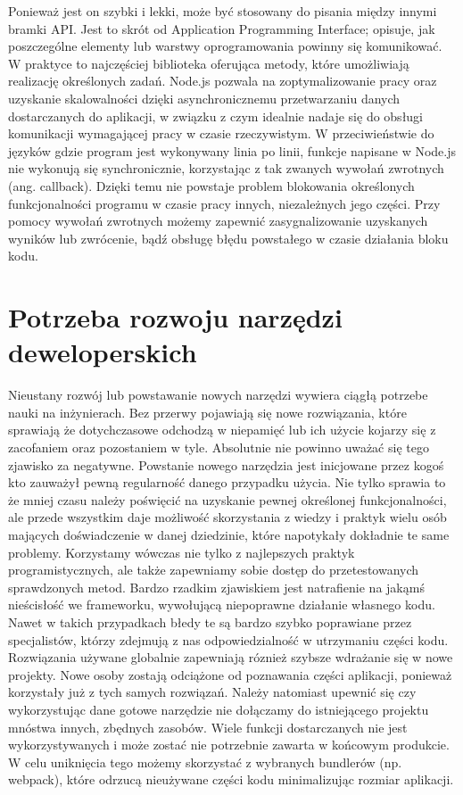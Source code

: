 \documentclass[12pt]{report}
\begin{document}
    Ponieważ jest on szybki i lekki, może być stosowany do pisania między innymi bramki API.
    Jest to skrót od Application Programming Interface; opisuje, jak poszczególne elementy lub warstwy oprogramowania powinny się komunikować.
    W praktyce to najczęściej biblioteka oferująca metody, które umożliwiają realizację określonych zadań.
    Node.js pozwala na zoptymalizowanie pracy oraz uzyskanie skalowalności dzięki asynchronicznemu przetwarzaniu danych dostarczanych do aplikacji, w związku z czym idealnie nadaje się do obsługi komunikacji wymagającej pracy w czasie rzeczywistym.
    W przeciwieństwie do języków gdzie program jest wykonywany linia po linii, funkcje napisane w Node.js nie wykonują się synchronicznie, korzystając z tak zwanych wywołań zwrotnych (ang. callback).
    Dzięki temu nie powstaje problem blokowania określonych funkcjonalności programu w czasie pracy innych, niezależnych jego części.
    Przy pomocy wywołań zwrotnych możemy zapewnić zasygnalizowanie uzyskanych wyników lub zwrócenie, bądź obsługę błędu powstałego w czasie działania bloku kodu.

  \section{Potrzeba rozwoju narzędzi deweloperskich}
    Nieustany rozwój lub powstawanie nowych narzędzi wywiera ciągłą potrzebe nauki na inżynierach.
    Bez przerwy pojawiają się nowe rozwiązania, które sprawiają że dotychczasowe odchodzą w niepamięć lub ich użycie kojarzy się z zacofaniem oraz pozostaniem w tyle.
    Absolutnie nie powinno uważać się tego zjawisko za negatywne.
    Powstanie nowego narzędzia jest inicjowane przez kogoś kto zauważył pewną regularność danego przypadku użycia.
    Nie tylko sprawia to że mniej czasu należy poświęcić na uzyskanie pewnej określonej funkcjonalności, ale przede wszystkim daje możliwość skorzystania z wiedzy i praktyk wielu osób mających doświadczenie w danej dziedzinie, które napotykały dokładnie te same problemy.
    Korzystamy wówczas nie tylko z najlepszych praktyk programistycznych, ale także zapewniamy sobie dostęp do przetestowanych sprawdzonych metod.
    Bardzo rzadkim zjawiskiem jest natrafienie na jakąmś nieścisłość we frameworku, wywołującą niepoprawne działanie własnego kodu.
    Nawet w takich przypadkach błedy te są bardzo szybko poprawiane przez specjalistów, którzy zdejmują z nas odpowiedzialność w utrzymaniu części kodu.
    Rozwiązania używane globalnie zapewniają róznież szybsze wdrażanie się w nowe projekty.
    Nowe osoby zostają odciążone od poznawania części aplikacji, ponieważ korzystały już z tych samych rozwiązań.
    Należy natomiast upewnić się czy wykorzystując dane gotowe narzędzie nie dołączamy do istniejącego projektu mnóstwa innych, zbędnych zasobów.
    Wiele funkcji dostarczanych nie jest wykorzystywanych i może zostać nie potrzebnie zawarta w końcowym produkcie.
    W celu uniknięcia tego możemy skorzystać z wybranych bundlerów (np. webpack), które odrzucą nieużywane części kodu minimalizując rozmiar aplikacji.
\end{document}
